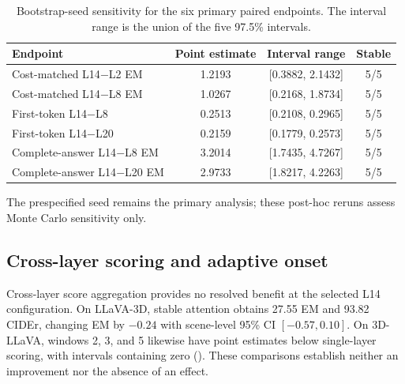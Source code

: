 \begin{table}[t]
\centering
\small
\caption{Bootstrap-seed sensitivity for the six primary paired endpoints. The interval range is the union of the five 97.5\% intervals.}
\label{tab:supp_primary_seed}
\begin{tabular}{lccc}
\toprule
Endpoint & Point estimate & Interval range & Stable \\
\midrule
Cost-matched L14$-$L2 EM & 1.2193 & [0.3882, 2.1432] & 5/5 \\
Cost-matched L14$-$L8 EM & 1.0267 & [0.2168, 1.8734] & 5/5 \\
First-token L14$-$L8 & 0.2513 & [0.2108, 0.2965] & 5/5 \\
First-token L14$-$L20 & 0.2159 & [0.1779, 0.2573] & 5/5 \\
Complete-answer L14$-$L8 EM & 3.2014 & [1.7435, 4.7267] & 5/5 \\
Complete-answer L14$-$L20 EM & 2.9733 & [1.8217, 4.2263] & 5/5 \\
\bottomrule
\end{tabular}
\end{table}

The prespecified seed remains the primary analysis; these post-hoc reruns assess Monte Carlo sensitivity only.

\subsection{Cross-layer scoring and adaptive onset}
Cross-layer score aggregation provides no resolved benefit at the selected L14 configuration. On LLaVA-3D, stable attention obtains 27.55 EM and 93.82 CIDEr, changing EM by $-0.24$ with scene-level 95\% CI $[-0.57,0.10]$. On 3D-LLaVA, windows 2, 3, and 5 likewise have point estimates below single-layer scoring, with intervals containing zero (). These comparisons establish neither an improvement nor the absence of an effect.

\begin{table}[t]
\centering
\caption{Stable-attention scoring on 3D-LLaVA ScanQA, L14, 10/100 tokens.}
\label{tab:supp_stable}
\end{table}


